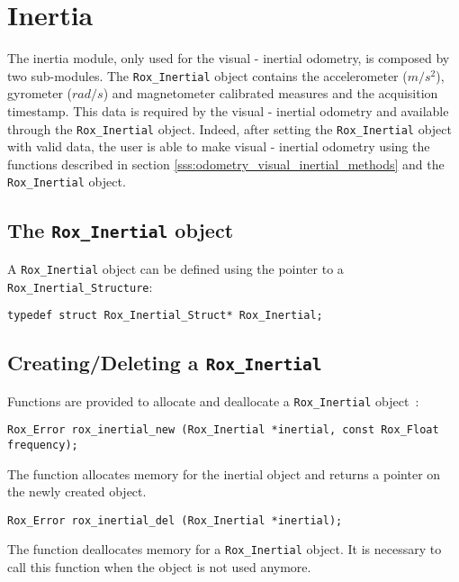 \section{Inertia}
\label{sec:inertia}

The inertia module, only used for the visual - inertial odometry, is composed by two sub-modules. The {\tt Rox\_Inertial} object contains the accelerometer ($m/s^2$), gyrometer ($rad/s$) and magnetometer calibrated measures and the acquisition timestamp. This data is required by the visual - inertial odometry and available through the {\tt Rox\_Inertial} object. Indeed, after setting the {\tt Rox\_Inertial} object with valid data, the user is able to make visual - inertial odometry using the functions described in section \ref{sss:odometry_visual_inertial_methods} and the {\tt Rox\_Inertial} object.

\subsection{The {\tt Rox\_Inertial} object}
\label{sse:inertial_struct}

A \lstinline$Rox_Inertial$ object can be defined using the pointer to a \lstinline$Rox_Inertial_Structure$:
\begin{lstlisting}
typedef struct Rox_Inertial_Struct* Rox_Inertial;
\end{lstlisting}

\subsection{Creating/Deleting a {\tt Rox\_Inertial}}
\label{sse:inertial_newdel}

Functions are provided to allocate and deallocate a \lstinline$Rox_Inertial$ object~:

\begin{lstlisting}
Rox_Error rox_inertial_new (Rox_Inertial *inertial, const Rox_Float frequency);
\end{lstlisting}
The function allocates memory for the inertial object and returns a pointer on the newly created object.

\begin{lstlisting}
Rox_Error rox_inertial_del (Rox_Inertial *inertial);
\end{lstlisting}
The function deallocates memory for a \lstinline$Rox_Inertial$ object. 
It is necessary to call this function when the object is not used anymore. \\

